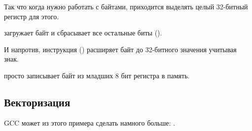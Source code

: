 Так что когда нужно работать с байтами, приходится выделять целый 32-битный регистр для этого.

 загружает байт и сбрасывает все остальные биты ().

И напротив, инструкция  () расширяет байт до 32-битного значения учитывая знак.

 просто записывает байт из младших 8 бит регистра в память.

\subsection{Векторизация}

\Optimizing GCC может из этого примера сделать намного больше: .
